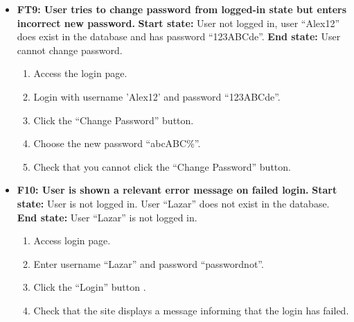 \documentclass{article}
\begin{document}
\begin{itemize}
		\item \textbf {FT9: User tries to change password from logged-in state but enters incorrect new password.} \newline
		\textbf{Start state:} User not logged in, user “Alex12” does exist in the database and has password “123ABCde”. \newline
		\textbf{End state:} User cannot change password.
		\begin{enumerate}
			\item Access the login page.
			\item Login with username ’Alex12’ and password “123ABCde”.
			\item Click the “Change Password” button.
			\item Choose the new password “abcABC\%”.
			\item Check that you cannot click the “Change Password” button.
		\end{enumerate}
		
		\item \textbf{F10: User is shown a relevant error message on failed login.} \newline
		\textbf{Start state:} User is not logged in. User “Lazar” does not exist in the database. \newline
		\textbf{End state:} User “Lazar” is not logged in.
		\begin{enumerate}
			\item Access login page.
			\item Enter username “Lazar” and password “passwordnot”.
			\item Click the “Login” button .
			\item Check that the site displays a message informing that the login has failed.
		\end{enumerate}
		
	\end{itemize}
	
\end{document}
